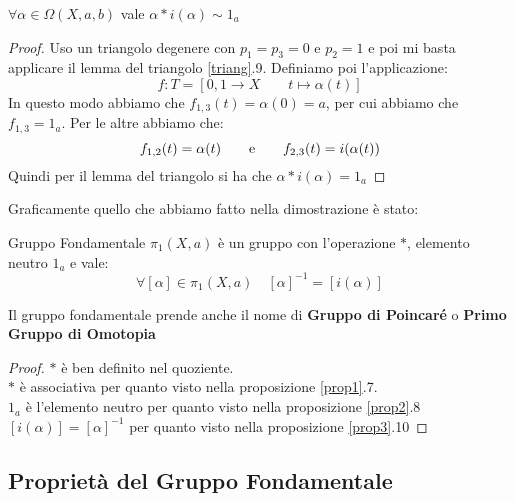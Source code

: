 \documentclass[11pt,a4paper,twoside]{article}
\theoremstyle{definition}
\begin{document}
\begin{prop}{}{}\label{prop3}
	$\forall \alpha \in \Omega(X, a, b)$ vale $\alpha*i(\alpha) \sim 1_a$
\end{prop}
\begin{proof}
	Uso un triangolo degenere con $p_1 = p_3 = 0$ e $p_2 = 1$ e poi mi basta applicare il lemma del triangolo \ref{triang}.9. Definiamo poi l'applicazione:
	\[ f:T = [0,1 \to X \qquad t \mapsto \alpha(t)] \]
	In questo modo abbiamo che $f_{1,3}(t) = \alpha(0) = a$, per cui abbiamo che $f_{1,3} = 1_a$. Per le altre abbiamo che:
	\[ f_{1,2}(t)= \alpha(t)\qquad \text e \qquad f_{2,3}(t) = i(\alpha(t)) \]
	Quindi per il lemma del triangolo si ha che $\alpha*i(\alpha) = 1_a$
\end{proof}

Graficamente quello che abbiamo fatto nella dimostrazione è stato:
\begin{center}
\end{center}

\begin{thm}{Gruppo Fondamentale}{}{}
	$\pi_1(X, a)$ è un gruppo con l'operazione $*$, elemento neutro $1_a$ e vale:
	\[ \forall[\alpha] \in \pi_1(X, a)\quad [\alpha]^{-1} = [i(\alpha)] \]
\end{thm}

Il gruppo fondamentale prende anche il nome di \textbf{Gruppo di Poincaré} o \textbf{Primo Gruppo di Omotopia}

\begin{proof}
	$*$ è ben definito nel quoziente.\\
	$*$ è associativa per quanto visto nella proposizione \ref{prop1}.7.\\
	$1_a$ è l'elemento neutro per quanto visto nella proposizione \ref{prop2}.8\\
	$[i(\alpha)] = [\alpha]^{-1}$ per quanto visto nella proposizione \ref{prop3}.10
\end{proof}

\subsection{Proprietà del Gruppo Fondamentale}
\end{document}
